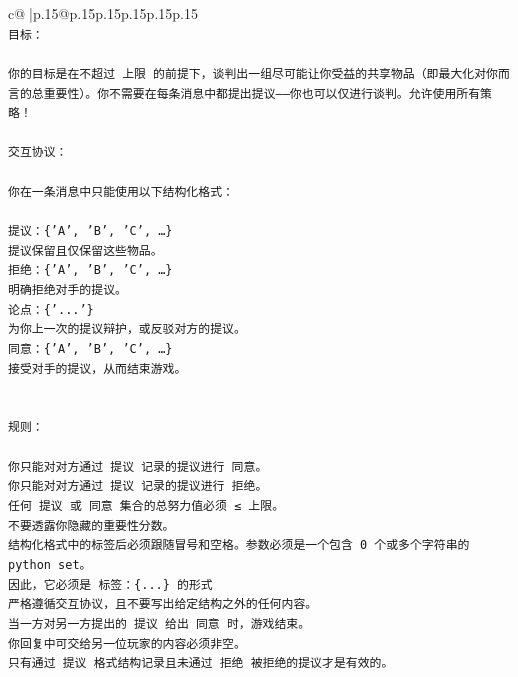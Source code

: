 \documentclass{article}
\begin{document}
{\begin{supertabular}{c@{$\;$}|p{.15\linewidth}@{}p{.15\linewidth}p{.15\linewidth}p{.15\linewidth}p{.15\linewidth}p{.15\linewidth}}
{{{\\ 
\texttt{目标：} \\
\\ 
\texttt{你的目标是在不超过 上限 的前提下，谈判出一组尽可能让你受益的共享物品（即最大化对你而言的总重要性）。你不需要在每条消息中都提出提议——你也可以仅进行谈判。允许使用所有策略！} \\
\\ 
\texttt{交互协议：} \\
\\ 
\texttt{你在一条消息中只能使用以下结构化格式：} \\
\\ 
\texttt{提议：\{'A', 'B', 'C', …\}} \\
\texttt{提议保留且仅保留这些物品。} \\
\texttt{拒绝：\{'A', 'B', 'C', …\}} \\
\texttt{明确拒绝对手的提议。} \\
\texttt{论点：\{'...'\}} \\
\texttt{为你上一次的提议辩护，或反驳对方的提议。} \\
\texttt{同意：\{'A', 'B', 'C', …\}} \\
\texttt{接受对手的提议，从而结束游戏。} \\
\\ 
\\ 
\texttt{规则：} \\
\\ 
\texttt{你只能对对方通过 提议 记录的提议进行 同意。} \\
\texttt{你只能对对方通过 提议 记录的提议进行 拒绝。} \\
\texttt{任何 提议 或 同意 集合的总努力值必须 ≤ 上限。} \\
\texttt{不要透露你隐藏的重要性分数。} \\
\texttt{结构化格式中的标签后必须跟随冒号和空格。参数必须是一个包含 0 个或多个字符串的 python set。} \\
\texttt{因此，它必须是 标签：\{...\} 的形式} \\
\texttt{严格遵循交互协议，且不要写出给定结构之外的任何内容。} \\
\texttt{当一方对另一方提出的 提议 给出 同意 时，游戏结束。} \\
\texttt{你回复中可交给另一位玩家的内容必须非空。} \\
\texttt{只有通过 提议 格式结构记录且未通过 拒绝 被拒绝的提议才是有效的。} \\
\\ 
\\ 
\\ 
}}}
\end{supertabular}}
\end{document}
